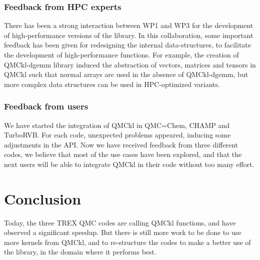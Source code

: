 \subsubsection{Feedback from HPC experts}

There has been a strong interaction between WP1 and WP3 for the
development of high-performance versions of the library. In this
collaboration, some important feedback has been given for redesigning
the internal data-structures, to facilitate the development of
high-performance functions. 
For example, the creation of QMCkl-dgemm library induced the
abstraction of vectors, matrices and tensors in QMCkl such that normal
arrays are used in the absence of QMCkl-dgemm, but more complex data
structures can be used in HPC-optimized variants.


\subsubsection{Feedback from users}

We have started the integration of QMCkl in QMC=Chem, CHAMP and
TurboRVB. For each code, unexpected problems appeared, inducing some
adjustments in the \ac{API}. Now we have received feedback from three
different codes, we believe that most of the use cases have been
explored, and that the next users will be able to integrate QMCkl in
their code without too many effort.

\section{Conclusion}

Today, the three TREX QMC codes are calling QMCkl functions, and have
observed a significant speedup. But there is still more work to be
done to use more kernels from QMCkl, and to re-structure the codes to
make a better use of the library, in the domain where it performs best.

